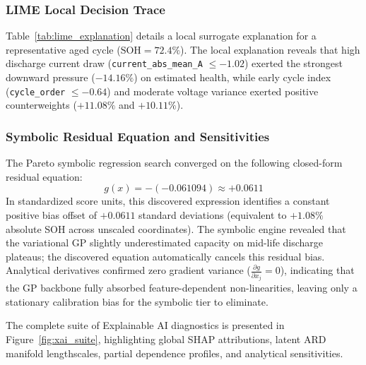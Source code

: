 \documentclass[a4paper,fleqn]{cas-sc}
\begin{document}
\subsubsection{LIME Local Decision Trace}
Table~\ref{tab:lime_explanation} details a local surrogate explanation for a representative aged cycle ($\text{SOH} = 72.4\%$). The local explanation reveals that high discharge current draw (\texttt{current\_abs\_mean\_A} $\le -1.02$) exerted the strongest downward pressure ($-14.16\%$) on estimated health, while early cycle index (\texttt{cycle\_order} $\le -0.64$) and moderate voltage variance exerted positive counterweights ($+11.08\%$ and $+10.11\%$).

\subsubsection{Symbolic Residual Equation and Sensitivities}
The Pareto symbolic regression search converged on the following closed-form residual equation:
\begin{equation}
    g(x) = -(-0.061094) \approx +0.0611
\end{equation}
In standardized score units, this discovered expression identifies a constant positive bias offset of $+0.0611$ standard deviations (equivalent to $+1.08\%$ absolute SOH across unscaled coordinates). The symbolic engine revealed that the variational GP slightly underestimated capacity on mid-life discharge plateaus; the discovered equation automatically cancels this residual bias. Analytical derivatives confirmed zero gradient variance ($\frac{\partial g}{\partial x_j} = 0$), indicating that the GP backbone fully absorbed feature-dependent non-linearities, leaving only a stationary calibration bias for the symbolic tier to eliminate.

The complete suite of Explainable AI diagnostics is presented in Figure~\ref{fig:xai_suite}, highlighting global SHAP attributions, latent ARD manifold lengthscales, partial dependence profiles, and analytical sensitivities.
\end{document}
